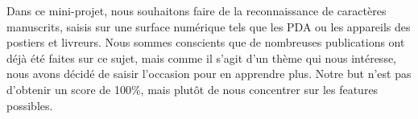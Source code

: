 
Dans ce mini-projet, nous souhaitons faire de la reconnaissance de caractères manuscrits, saisis sur une surface numérique tels que les PDA ou les appareils des postiers et livreurs. Nous sommes conscients que de nombreuses publications ont déjà été faites sur ce sujet, mais comme il s'agit d'un thème qui nous intéresse, nous avons décidé de saisir l'occasion pour en apprendre plus. Notre but n'est pas d'obtenir un score de 100\%, mais plutôt de nous concentrer sur les features possibles.